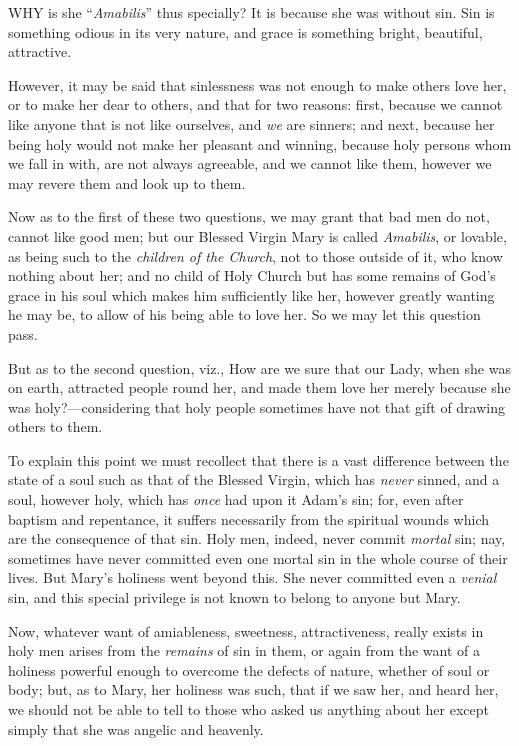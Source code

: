 

WHY
is she ``\emph{Amabilis}'' thus specially? It is because she was without
sin. Sin is something odious in its very nature, and grace is something
bright, beautiful, attractive.

However, it may be said that
sinlessness was not enough to make others love her, or to make her dear
to others, and that for two reasons: first, because we cannot like
anyone that is not like ourselves, and \emph{we} are sinners; and next,
because her being holy would not make her pleasant and winning, because
holy persons whom we fall in with, are not always agreeable, and we
cannot like them, however we may revere them and look up to them.

Now as to the first of these two
questions, we may grant that bad men do not, cannot like good men; but
our Blessed Virgin Mary is called \emph{Amabilis}, or lovable, as being
such to the \emph{children of the Church}, not to those outside of it,
who know nothing about her; and no child of Holy Church but has some
remains of God's grace in his soul which makes him sufficiently
like her, however greatly wanting he may be, to allow of his being able
to love her. So we may let this question pass.

But as to the second question,
viz., How are we sure that our Lady, when she was on earth, attracted
people round her, and made them love her merely because she was
holy?—considering that holy people sometimes have not that gift of
drawing others to them.

To explain this point we must
recollect that there is a vast difference between the state of a soul
such as that of the Blessed Virgin, which has \emph{never} sinned, and a
soul, however holy, which has \emph{once} had upon it Adam's sin; for,
even after baptism and repentance, it suffers necessarily from the
spiritual wounds which are the consequence of that sin. Holy men,
indeed, never commit \emph{mortal} sin; nay, sometimes have never
committed even one mortal sin in the whole course of their lives. But
Mary's holiness went beyond this. She never committed even a \emph{venial}
sin, and this special privilege is not known to belong to anyone but
Mary.

Now, whatever want of
amiableness, sweetness, attractiveness, really exists in holy men arises
from the \emph{remains} of sin in them, or again from the want of a
holiness powerful enough to overcome the defects of nature, whether of
soul or body; but, as to Mary, her holiness was such, that if we saw
her, and heard her, we should not be able to tell to those who asked us
anything about her except simply that she was angelic and heavenly.

